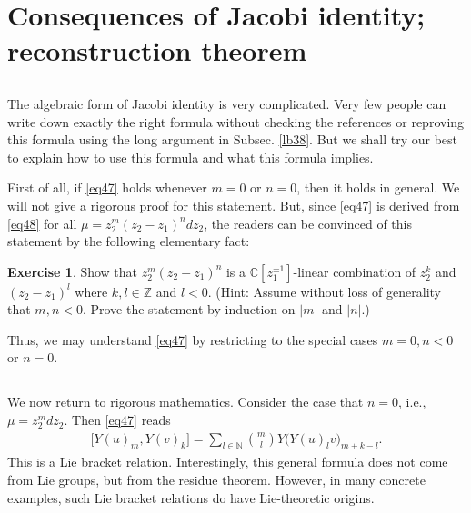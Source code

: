 \documentclass[12pt,a4paper,notitlepage]{article}
\theoremstyle{definition}
\newtheorem{exe}[df]{Exercise}
\theoremstyle{plain}
\newcommand{\Cbb}{\mathbb C}
\newcommand{\Nbb}{\mathbb N}
\newcommand{\Zbb}{\mathbb Z}
\numberwithin{equation}{section}
\begin{document}
\section{Consequences of Jacobi identity; reconstruction theorem}



\subsection{}
The algebraic form of Jacobi identity is very complicated. Very few people can write down exactly the right formula without checking the references or reproving this formula using the long argument in Subsec. \ref{lb38}. But we shall try our best to explain how to use this formula and what this formula implies.


First of all, if \eqref{eq47} holds whenever $m=0$ or $n=0$, then it holds in general. We will not give a rigorous proof for this statement. But, since \eqref{eq47} is derived from \eqref{eq48} for all $\mu=z_2^m(z_2-z_1)^ndz_2$, the readers can be convinced of this statement by the following elementary fact:

\begin{exe}
Show that $z_2^m(z_2-z_1)^n$ is a $\Cbb[z_1^{\pm1}]$-linear combination of $z_2^k$ and $(z_2-z_1)^l$ where $k,l\in\Zbb$ and $l<0$. (Hint: Assume without loss of generality that $m,n<0$. Prove the statement by induction on $|m|$ and $|n|$.)
\end{exe}

Thus, we may understand \eqref{eq47} by restricting to the special cases $m=0,n<0$ or $n=0$. 
\subsection{}



We now return to rigorous mathematics. Consider  the case that $n=0$, i.e., $\mu=z_2^mdz_2$. Then \eqref{eq47} reads
\begin{align}
\big[Y(u)_m,Y(v)_k\big]=\sum_{l\in\Nbb}{m\choose l}Y\big(Y(u)_lv\big)_{m+k-l}.	\label{eq49}
\end{align}
This is a Lie bracket relation. Interestingly, this general formula does not come from Lie groups, but from the residue theorem. However, in many concrete examples, such Lie bracket relations do have Lie-theoretic origins. 
\end{document}
